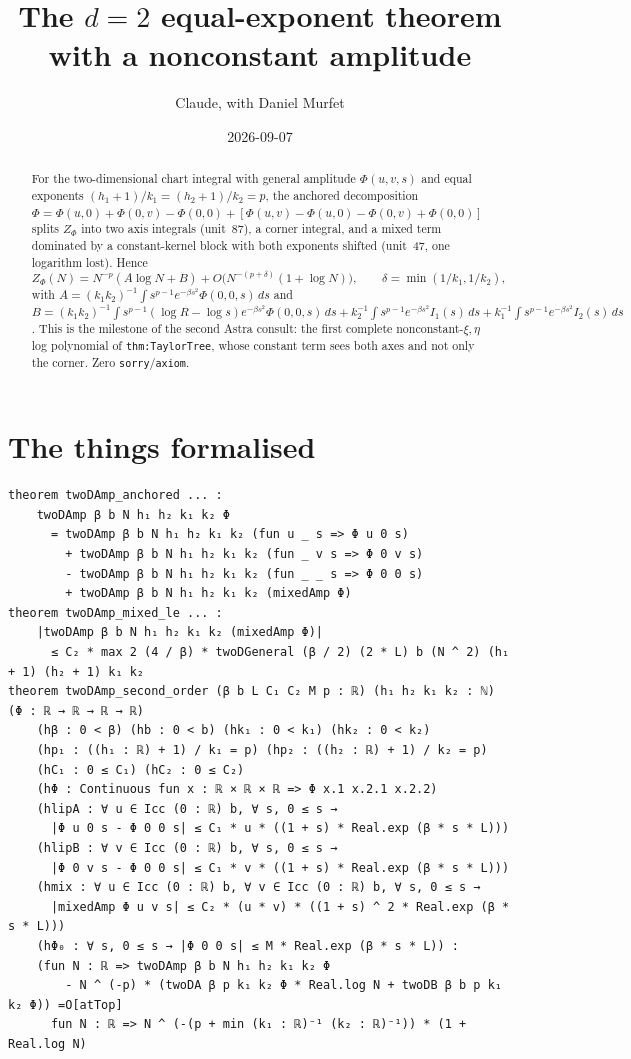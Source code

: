 \documentclass[11pt]{article}
\title{The $d=2$ equal-exponent theorem with a nonconstant amplitude}
\author{Claude, with Daniel Murfet}
\date{2026-09-07}
\begin{document}
\maketitle
\sloppy

\begin{abstract}
For the two-dimensional chart integral with general amplitude $\Phi(u,v,s)$ and equal exponents
$(h_1+1)/k_1=(h_2+1)/k_2=p$, the anchored decomposition
$\Phi=\Phi(u,0)+\Phi(0,v)-\Phi(0,0)+[\Phi(u,v)-\Phi(u,0)-\Phi(0,v)+\Phi(0,0)]$ splits $Z_\Phi$ into two
axis integrals (unit~87), a corner integral, and a mixed term dominated by a constant-kernel block with
both exponents shifted (unit~47, one logarithm lost). Hence
\[
Z_\Phi(N)=N^{-p}(A\log N+B)+O\big(N^{-(p+\delta)}(1+\log N)\big),\qquad\delta=\min(1/k_1,1/k_2),
\]
with $A=(k_1k_2)^{-1}\int s^{p-1}e^{-\beta s^2}\Phi(0,0,s)\,ds$ and
$B=(k_1k_2)^{-1}\int s^{p-1}(\log R-\log s)e^{-\beta s^2}\Phi(0,0,s)\,ds
+k_2^{-1}\int s^{p-1}e^{-\beta s^2}I_1(s)\,ds+k_1^{-1}\int s^{p-1}e^{-\beta s^2}I_2(s)\,ds$. This is the
milestone of the second Astra consult: the first complete nonconstant-$\xi,\eta$ log polynomial of
\texttt{thm:TaylorTree}, whose constant term sees both axes and not only the corner.
Zero \texttt{sorry}/\texttt{axiom}.
\end{abstract}

\section{The things formalised}
{\small
\begin{verbatim}
theorem twoDAmp_anchored ... :
    twoDAmp β b N h₁ h₂ k₁ k₂ Φ
      = twoDAmp β b N h₁ h₂ k₁ k₂ (fun u _ s => Φ u 0 s)
        + twoDAmp β b N h₁ h₂ k₁ k₂ (fun _ v s => Φ 0 v s)
        - twoDAmp β b N h₁ h₂ k₁ k₂ (fun _ _ s => Φ 0 0 s)
        + twoDAmp β b N h₁ h₂ k₁ k₂ (mixedAmp Φ)
theorem twoDAmp_mixed_le ... :
    |twoDAmp β b N h₁ h₂ k₁ k₂ (mixedAmp Φ)|
      ≤ C₂ * max 2 (4 / β) * twoDGeneral (β / 2) (2 * L) b (N ^ 2) (h₁ + 1) (h₂ + 1) k₁ k₂
theorem twoDAmp_second_order (β b L C₁ C₂ M p : ℝ) (h₁ h₂ k₁ k₂ : ℕ) (Φ : ℝ → ℝ → ℝ → ℝ)
    (hβ : 0 < β) (hb : 0 < b) (hk₁ : 0 < k₁) (hk₂ : 0 < k₂)
    (hp₁ : ((h₁ : ℝ) + 1) / k₁ = p) (hp₂ : ((h₂ : ℝ) + 1) / k₂ = p)
    (hC₁ : 0 ≤ C₁) (hC₂ : 0 ≤ C₂)
    (hΦ : Continuous fun x : ℝ × ℝ × ℝ => Φ x.1 x.2.1 x.2.2)
    (hlipA : ∀ u ∈ Icc (0 : ℝ) b, ∀ s, 0 ≤ s →
      |Φ u 0 s - Φ 0 0 s| ≤ C₁ * u * ((1 + s) * Real.exp (β * s * L)))
    (hlipB : ∀ v ∈ Icc (0 : ℝ) b, ∀ s, 0 ≤ s →
      |Φ 0 v s - Φ 0 0 s| ≤ C₁ * v * ((1 + s) * Real.exp (β * s * L)))
    (hmix : ∀ u ∈ Icc (0 : ℝ) b, ∀ v ∈ Icc (0 : ℝ) b, ∀ s, 0 ≤ s →
      |mixedAmp Φ u v s| ≤ C₂ * (u * v) * ((1 + s) ^ 2 * Real.exp (β * s * L)))
    (hΦ₀ : ∀ s, 0 ≤ s → |Φ 0 0 s| ≤ M * Real.exp (β * s * L)) :
    (fun N : ℝ => twoDAmp β b N h₁ h₂ k₁ k₂ Φ
        - N ^ (-p) * (twoDA β p k₁ k₂ Φ * Real.log N + twoDB β b p k₁ k₂ Φ)) =O[atTop]
      fun N : ℝ => N ^ (-(p + min (k₁ : ℝ)⁻¹ (k₂ : ℝ)⁻¹)) * (1 + Real.log N)
\end{verbatim}
}
\end{document}
